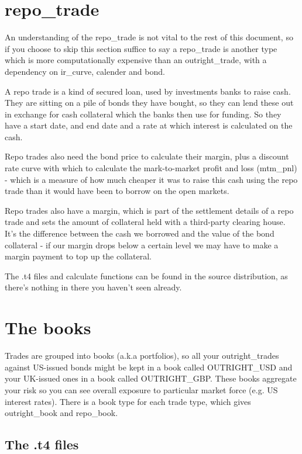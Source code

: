 \documentclass{report}
\begin{document}
\section{repo_trade}

An understanding of the repo_trade is not vital to the rest of this document, so if you choose to skip this section suffice to say a repo_trade is another type which is more computationally expensive than an outright_trade, with a dependency on ir_curve, calender and bond. 

A repo trade is a kind of secured loan, used by investments banks to raise cash. They are sitting on a pile of bonds they have bought, so they can lend these out in exchange for cash collateral which the banks then use for funding. So they have a start date, and end date and a rate at which interest is calculated on the cash.

Repo trades also need the bond price to calculate their margin, plus a discount rate curve with which to 
calculate the mark-to-market profit and loss (mtm_pnl) - which is a measure of how much cheaper it was to raise this cash using the repo trade than it would have been to borrow on the open markets.

Repo trades also have a margin, which is part of the settlement details of a repo trade and sets the amount of collateral held with a third-party clearing house. It's the difference between the cash we borrowed and the value of the bond collateral - if our margin drops below a certain level we may have to make a margin payment to top up the collateral.

The .t4 files and calculate functions can be found in the source distribution, as there's nothing in there you haven't seen already. 

\section{The books}

Trades are grouped into books (a.k.a portfolios), so all your outright_trades against US-issued bonds might be kept in a book called OUTRIGHT_USD and your UK-issued ones in a book called OUTRIGHT_GBP. These books aggregate your risk so you can see overall exposure to particular market force (e.g. US interest rates). There is a book type for each trade type, which gives outright_book and repo_book.


\subsection{The .t4 files}
\end{document}
